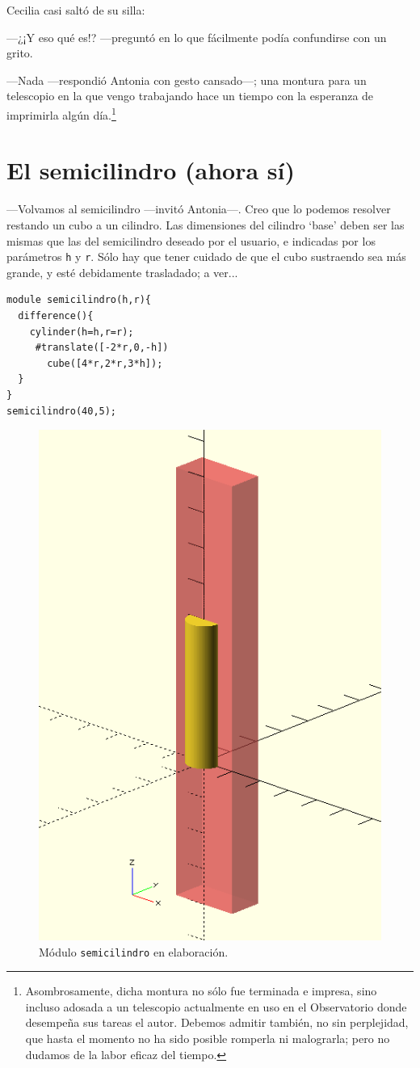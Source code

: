   Cecilia casi saltó de su silla:

  ---¿¡Y eso qué es!?  ---preguntó en lo que fácilmente podía
  confundirse con un grito.

  ---Nada ---respondió Antonia con gesto cansado---; una montura para
  un telescopio en la que vengo trabajando hace un tiempo con la
  esperanza de imprimirla algún día.\footnote{Asombrosamente, dicha
    montura no sólo fue terminada e impresa, sino incluso adosada a un
    telescopio actualmente en uso en el Observatorio donde desempeña
    sus tareas el autor. Debemos admitir también, no sin perplejidad,
    que hasta el momento no ha sido posible romperla ni malograrla;
    pero no dudamos de la labor eficaz del tiempo.}

  
  \section{El semicilindro (ahora sí)}

  ---Volvamos al semicilindro ---invitó Antonia---.  Creo que lo
  podemos resolver restando un cubo a un cilindro. Las dimensiones del
  cilindro `base' deben ser las mismas que las del semicilindro deseado
  por el usuario, e indicadas por los parámetros \texttt{h} y
  \texttt{r}. Sólo hay que tener cuidado de que el cubo sustraendo sea
  más grande, y esté debidamente trasladado; a ver...


    \begin{lstlisting}
module semicilindro(h,r){
  difference(){
    cylinder(h=h,r=r);
     #translate([-2*r,0,-h])
       cube([4*r,2*r,3*h]);
  }
}
semicilindro(40,5);
    \end{lstlisting}

    \begin{figure}[ht]
      \centering
      \includegraphics[width=.35\textwidth]{imagenes/semicilindro-1}      
      \caption{Módulo \texttt{semicilindro} en elaboración.}
      \label{fig:semicilindro-1}
    \end{figure}


